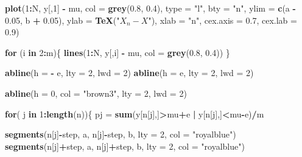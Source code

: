 \documentclass[]{article}
\newenvironment{Shaded}{\begin{snugshade}}{\end{snugshade}}
\newcommand{\KeywordTok}[1]{\textcolor[rgb]{0.13,0.29,0.53}{\textbf{#1}}}
\newcommand{\DataTypeTok}[1]{\textcolor[rgb]{0.13,0.29,0.53}{#1}}
\newcommand{\DecValTok}[1]{\textcolor[rgb]{0.00,0.00,0.81}{#1}}
\newcommand{\FloatTok}[1]{\textcolor[rgb]{0.00,0.00,0.81}{#1}}
\newcommand{\StringTok}[1]{\textcolor[rgb]{0.31,0.60,0.02}{#1}}
\newcommand{\ControlFlowTok}[1]{\textcolor[rgb]{0.13,0.29,0.53}{\textbf{#1}}}
\newcommand{\OperatorTok}[1]{\textcolor[rgb]{0.81,0.36,0.00}{\textbf{#1}}}
\newcommand{\NormalTok}[1]{#1}
\begin{document}
\begin{Shaded}
\begin{Highlighting}[]
  \KeywordTok{plot}\NormalTok{(}\DecValTok{1}\OperatorTok{:}\NormalTok{N, y[,}\DecValTok{1}\NormalTok{] }\OperatorTok{-}\StringTok{ }\NormalTok{mu, }\DataTypeTok{col =} \KeywordTok{grey}\NormalTok{(}\FloatTok{0.8}\NormalTok{, }\FloatTok{0.4}\NormalTok{), }\DataTypeTok{type =} \StringTok{"l"}\NormalTok{,}
       \DataTypeTok{bty =} \StringTok{"n"}\NormalTok{, }
       \DataTypeTok{ylim =} \KeywordTok{c}\NormalTok{(a }\OperatorTok{-}\StringTok{ }\FloatTok{0.05}\NormalTok{, b }\OperatorTok{+}\StringTok{ }\FloatTok{0.05}\NormalTok{), }
       \DataTypeTok{ylab =} \KeywordTok{TeX}\NormalTok{(}\StringTok{"$X_n-X$"}\NormalTok{),}
       \DataTypeTok{xlab =} \StringTok{"n"}\NormalTok{,}
       \DataTypeTok{cex.axis =} \FloatTok{0.7}\NormalTok{,}
       \DataTypeTok{cex.lab =} \FloatTok{0.9}\NormalTok{)}
  
  \ControlFlowTok{for}\NormalTok{ (i }\ControlFlowTok{in} \DecValTok{2}\OperatorTok{:}\NormalTok{m)\{}
    \KeywordTok{lines}\NormalTok{(}\DecValTok{1}\OperatorTok{:}\NormalTok{N, y[,i] }\OperatorTok{-}\StringTok{ }\NormalTok{mu, }\DataTypeTok{col =} \KeywordTok{grey}\NormalTok{(}\FloatTok{0.8}\NormalTok{, }\FloatTok{0.4}\NormalTok{))}
\NormalTok{  \}}
  
  
  \KeywordTok{abline}\NormalTok{(}\DataTypeTok{h =} \OperatorTok{-}\StringTok{ }\NormalTok{e, }\DataTypeTok{lty =} \DecValTok{2}\NormalTok{, }\DataTypeTok{lwd =} \DecValTok{2}\NormalTok{)}
  \KeywordTok{abline}\NormalTok{(}\DataTypeTok{h =}\NormalTok{ e, }\DataTypeTok{lty =} \DecValTok{2}\NormalTok{, }\DataTypeTok{lwd =} \DecValTok{2}\NormalTok{)}
  
  \KeywordTok{abline}\NormalTok{(}\DataTypeTok{h =} \DecValTok{0}\NormalTok{, }\DataTypeTok{col =} \StringTok{"brown3"}\NormalTok{, }\DataTypeTok{lty =} \DecValTok{2}\NormalTok{, }\DataTypeTok{lwd =} \DecValTok{2}\NormalTok{)}
  
  \ControlFlowTok{for}\NormalTok{( j }\ControlFlowTok{in} \DecValTok{1}\OperatorTok{:}\KeywordTok{length}\NormalTok{(n))\{}
\NormalTok{    pj =}\StringTok{ }\KeywordTok{sum}\NormalTok{(y[n[j],]}\OperatorTok{>}\NormalTok{mu}\OperatorTok{+}\NormalTok{e }\OperatorTok{|}\StringTok{ }\NormalTok{y[n[j],]}\OperatorTok{<}\NormalTok{mu}\OperatorTok{-}\NormalTok{e)}\OperatorTok{/}\NormalTok{m}
    
    \KeywordTok{segments}\NormalTok{(n[j]}\OperatorTok{-}\NormalTok{step, a, n[j]}\OperatorTok{-}\NormalTok{step, b, }\DataTypeTok{lty =} \DecValTok{2}\NormalTok{, }\DataTypeTok{col =} \StringTok{"royalblue"}\NormalTok{)}
    \KeywordTok{segments}\NormalTok{(n[j]}\OperatorTok{+}\NormalTok{step, a, n[j]}\OperatorTok{+}\NormalTok{step, b, }\DataTypeTok{lty =} \DecValTok{2}\NormalTok{, }\DataTypeTok{col =} \StringTok{"royalblue"}\NormalTok{)}
    

\end{Highlighting}
\end{Shaded}
\end{document}
